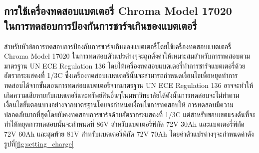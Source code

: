 \subsection{การใช้เครื่องทดสอบแบตเตอรี่ Chroma Model 17020 \\ ในการทดสอบการป้องกันการชาร์จเกินของแบตเตอรี่}
สำหรับหัวข้อการทดสอบการป้องกันการชาร์จเกินของแบตเตอรี่โดยใช้เครื่องทดสอบแบตเตอรี่ Chroma Model 17020 ในการทดสอบตัวแปรต่างๆจะถูกตั้งค่าให้เหมาะสมสำหรับการทดสอบตามมาตรฐาน UN ECE Regulation 136 โดยให้เครื่องทดสอบแบตเตอรี่ทำการชาร์จแบตเตอรี่ด้วยอัตรากระแสคงที่ 1/3C ซึ่งเครื่องทดสอบแบตเตอรี่นั้นจะสามารถกำหนดเงื่อนไขเพื่อหยุดทำการทดสอบได้จากขั้นตอนการทดสอบแบตเตอรี่จากมาตรฐาน 
UN ECE Regulation 136 อาจจะทำให้เกิดความเสียหายกับแบตเตอรี่และทรัพย์สินอื่นๆในมหาวิทยาลัยได้ดังนั้นการทดสอบจะไม่ทำตามเงื่อนไขขั้นตอนบางอย่างจากมาตรฐานโดยจะกำหนดเงื่อนไขการทดสอบให้
การทดสอบมีความปลอดภัยมากที่สุดโดยยังคงทดสอบการชาร์จด้วยอัตรากระแสคงที่ 1/3C แต่สำหรับขอบเขตแรงดันที่จะทำให้หยุดการทดสอบนั้นจะกำหนดที่ 86V สำหรับแบตเตอรี่พิกัด 72V 30Ah และแบตเตอรี่พิกัด 72V 60Ah และสุดท้าย 81V สำหรับแบตเตอรี่พิกัด 72V 70Ah โดยค่าตัวแปรต่างๆจะกำหนดค่าดังรูปที่\ref{fig:setting_charge}
